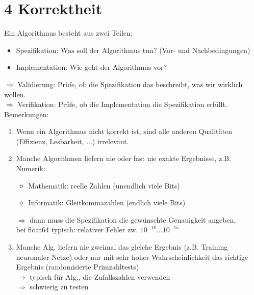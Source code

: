 
\chapter*{4 Korrektheit}

Ein Algorithmus besteht aus zwei Teilen:
\begin{itemize}
    \item Spezifikation: $\underline{\text{Was}}$ soll der Algorithmus tun? (Vor- und Nachbedingungen)
    \item Implementation: $\underline{\text{Wie}}$ geht der Algorithmus vor?
\end{itemize}
$\Rightarrow$ Validierung: Prüfe, ob die Spezifikation das beschreibt, was wir wirklich wollen. \\
$\Rightarrow$ Verifikation: Prüfe, ob die Implementation die Spezifikation erfüllt. \\

Bemerkungen:
\begin{enumerate}
    \item Wenn ein Algorithmus nicht korrekt ist, sind alle anderen Qualitäten (Effizienz, Lesbarkeit, ...) irrelevant.
    \item Manche Algorithmen liefern nie oder fast nie exakte Ergebnisse, z.B. Numerik:
    \begin{itemize}
        \item Mathematik: reelle Zahlen (unendlich viele Bits)
        \item Informatik: Gleitkommazahlen (endlich viele Bits)
    \end{itemize}
    $\Rightarrow$ dann muss die Spezifikation die gewünschte Genauigkeit angeben. \\
    bei float64 typisch: relativer Fehler zw. $10^{-10} \dots 10^{-15}$
    \item Manche Alg. liefern nie zweimal das gleiche Ergebnis (z.B. Training neuronaler Netze) oder nur mit sehr hoher Wahrscheinlichkeit das richtige Ergebnis (randomisierte Primzahltests)\\
    $\rightarrow$ typisch für Alg., die Zufallszahlen verwenden \\
    $\Rightarrow$ schwierig zu testen
\end{enumerate}

